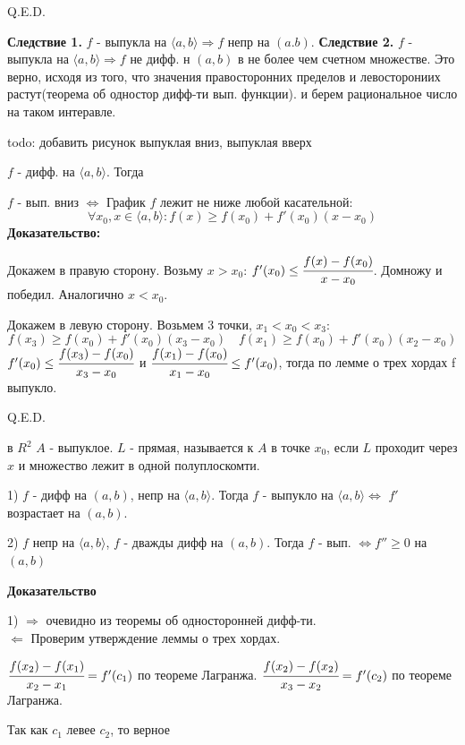 \hfill Q.E.D.

\textbf{Следствие 1.} $f$ - выпукла на $\langle a,b\rangle \Rightarrow f$ непр на $(a.b)$.
\textbf{Следствие 2.} $f$ - выпукла на $\langle a,b\rangle \Rightarrow f$ не дифф. н $(a,b)$ в не более чем счетном множестве. Это верно, исходя из того, что значения правосторонних пределов и левосторониих растут(теорема об одностор дифф-ти вып. функции). и берем рациональное число на таком интеравле.

todo: добавить рисунок выпуклая вниз, выпуклая вверх


$f$ - дифф. на $\langle a,b \rangle$. Тогда

$f$ - вып. вниз $\Leftrightarrow$ График $f$ лежит не ниже любой касательной:
$$\forall x_0,x \in \langle a,b\rangle: f(x) \geq f(x_0) + f'(x_0)(x-x_0)$$
\textbf{Доказательство:}

Докажем в правую сторону. Возьму $x>x_0$: $f'(x_0)\leq \cfrac{f(x)-f(x_0)}{x-x_0}$. Домножу и победил. Аналогично $x<x_0$.

Докажем в левую сторону. Возьмем 3 точки, $x_1<x_0<x_3$:
$$f(x_3)\geq f(x_0)+f'(x_0)(x_3-x_0)\quad f(x_1)\geq f(x_0)+f'(x_0)(x_2-x_0)$$
$f'(x_0)\leq \cfrac{f(x_3)-f(x_0)}{x_3-x_0}$ и $ \cfrac{f(x_1)-f(x_0)}{x_1-x_0} \leq f'(x_0)$, тогда  по лемме о трех хордах f выпукло.

\hfill Q.E.D.


 в $R^2$ $A$ - выпуклое. $L$ - прямая, называется  к $A$ в точке $x_0$, если $L$ проходит через $x$ и множество лежит в одной полуплоскомти.


1) $f$ - дифф на $(a,b)$, непр на $\langle a,b \rangle$. Тогда $f$ - выпукло на $\langle a,b\rangle$$\Leftrightarrow$ $f'$ возрастает на $(a,b)$.

2) $f$ непр на $\langle a,b \rangle$, $f$ - дважды дифф на $(a,b)$. Тогда $f$ - вып. $\Leftrightarrow f''\geq 0$ на $(a,b)$

\textbf{Доказательство}

1) $\Rightarrow$ очевидно из теоремы об односторонней дифф-ти.\\
$\Leftarrow$ Проверим утверждение леммы о трех хордах. 

$\cfrac{f(x_2)-f(x_1)}{x_2-x_1}= f'(c_1) $ по теореме Лагранжа.
$\cfrac{f(x_2)-f(x_2)}{x_3-x_2}= f'(c_2) $ по теореме Лагранжа.

Так как $c_1$ левее $c_2$, то верное

